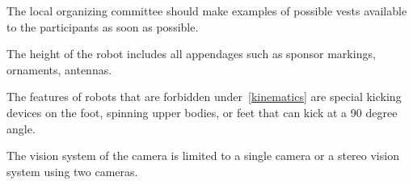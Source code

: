 \documentclass[12pt]{hurocup}
\begin{document}
\begin{decisions}
\item The local organizing committee should make examples of possible
  vests available to the participants as soon as possible.

\item The height of the robot includes all appendages such as sponsor
  markings, ornaments, antennas.
  
\item The features of robots that are forbidden under~\ref{kinematics}
  are special kicking devices on the foot, spinning upper bodies, or
  feet that can kick at a 90 degree angle.

\item The vision system of the camera is limited to a single camera or
  a stereo vision system using two cameras.

\end{decisions}

\label{law:referee}
\end{document}
